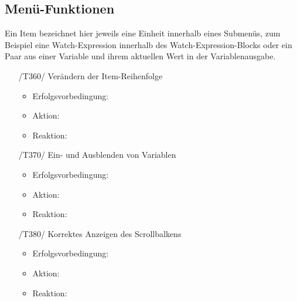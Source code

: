 \documentclass[parskip=full]{scrartcl}
\begin{document}
\subsection{Menü-Funktionen}

Ein Item bezeichnet hier jeweils eine Einheit innerhalb eines Submenüs, zum Beispiel eine Watch-Expression innerhalb des Watch-Expression-Blocks oder ein Paar aus einer Variable und ihrem aktuellen Wert in der Variablenausgabe.

\begin{itemize}

	\item[/T360/] Verändern der Item-Reihenfolge
		\begin{itemize}
		\item Erfolgsvorbedingung:
		\item Aktion:
		\item Reaktion:		
		\end{itemize}	
	
	\item[/T370/] Ein- und Ausblenden von Variablen
		\begin{itemize}
		\item Erfolgsvorbedingung:
		\item Aktion:
		\item Reaktion:		
		\end{itemize}	
	
	\item[/T380/] Korrektes Anzeigen des Scrollbalkens
		\begin{itemize}
		\item Erfolgsvorbedingung:
		\item Aktion:
		\item Reaktion:		
		\end{itemize}	
	
\end{itemize}


\newpage
\end{document}
